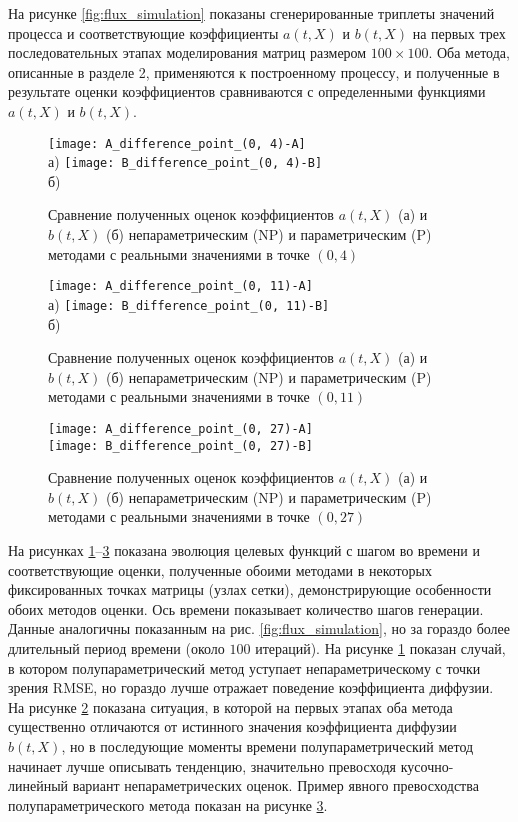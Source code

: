 На рисунке \ref{fig:flux_simulation} показаны сгенерированные триплеты значений процесса и соответствующие коэффициенты $a(t,X)$ и $b(t,X)$ на первых трех последовательных этапах моделирования матриц размером $100 \times 100$. Оба метода, описанные в разделе 2, применяются к построенному процессу, и полученные в результате оценки коэффициентов сравниваются с определенными функциями $a(t,X)$ и $b(t,X)$.

\begin{figure}[!h]
	\centering
	\texttt{[image: A\_difference\_point\_(0, 4)-A]}\\
	а)
	\texttt{[image: B\_difference\_point\_(0, 4)-B]}\\
	б)
	\caption{Сравнение полученных оценок коэффициентов $a(t,X)$ (а) и $b(t,X)$ (б) непараметрическим (NP) и параметрическим (P) методами с реальными значениями в точке $(0,4)$}
	\label{fig:difference_0_4}
\end{figure}

\begin{figure}[!h]
	\centering
	\texttt{[image: A\_difference\_point\_(0, 11)-A]}\\
	а)
	\texttt{[image: B\_difference\_point\_(0, 11)-B]}\\
	б)
	\caption{Сравнение полученных оценок коэффициентов $a(t,X)$ (а) и $b(t,X)$ (б) непараметрическим (NP) и параметрическим (P) методами с реальными значениями в точке $(0,11)$}
	\label{fig:difference_0_11}
\end{figure}

\begin{figure}[!h]
	\centering
	\texttt{[image: A\_difference\_point\_(0, 27)-A]}\\
	\texttt{[image: B\_difference\_point\_(0, 27)-B]}\\
	\caption{Сравнение полученных оценок коэффициентов $a(t,X)$ (а) и $b(t,X)$ (б) непараметрическим (NP) и параметрическим (P) методами с реальными значениями в точке $(0,27)$}
	\label{fig:difference_0_27}
\end{figure}

На рисунках \ref{fig:difference_0_4}--\ref{fig:difference_0_27} показана эволюция целевых функций с шагом во времени и соответствующие оценки, полученные обоими методами в некоторых фиксированных точках матрицы (узлах сетки), демонстрирующие особенности обоих методов оценки. Ось времени показывает количество шагов генерации. Данные аналогичны показанным на рис. \ref{fig:flux_simulation}, но за гораздо более длительный период времени (около $100$ итераций).
На рисунке \ref{fig:difference_0_4} показан случай, в котором полупараметрический метод уступает непараметрическому с точки зрения RMSE, но гораздо лучше отражает поведение коэффициента диффузии. На рисунке \ref{fig:difference_0_11} показана ситуация, в которой на первых этапах оба метода существенно отличаются от истинного значения коэффициента диффузии $b(t,X)$, но в последующие моменты времени полупараметрический метод начинает лучше описывать тенденцию, значительно превосходя кусочно-линейный вариант непараметрических оценок. Пример явного превосходства полупараметрического метода показан на рисунке \ref{fig:difference_0_27}.

